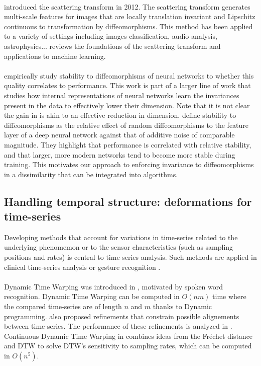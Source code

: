 \paragraph{}
\citet{mallat-scattering} introduced the scattering transform in 2012. The scattering transform generates multi-scale features for images that are locally translation invariant and Lipschitz continuous to transformation by diffeomorphisms. This method has been applied to a variety of settings including images classification, audio analysis, astrophysics... \citet{bruna-book} reviews the foundations of the scattering transform and applications to machine learning.

\paragraph{}
\citet{wyartdiffeo} empirically study stability to diffeomorphisms of neural networks to whether this quality correlates to performance. This work is part of a larger line of work that studies how internal representations of neural networks learn the invariances present in the data to effectively lower their dimension. Note that it is not clear the gain in \citet{bietti} is akin to an effective reduction in dimension. \citet{wyartdiffeo} define stability to diffeomorphisms as the relative effect of random diffeomorphisms to the feature layer of a deep neural network against that of additive noise of comparable magnitude. They highlight that performance is correlated with relative stability, and that larger, more modern networks tend to become more stable during training. This motivates our approach to enforcing invariance to diffeomorphisms in a dissimilarity that can be integrated into algorithms.

\subsection{Handling temporal structure: deformations for time-series}
\label{background:diffytw}

Developing methods that account for variations in time-series related to the underlying phenomemon or to the sensor characteristics (such as sampling positions and rates) is central to time-series analysis. Such methods are applied in clinical time-series analysis \citep{oh-invariances-clinical,ortiz-ieee} or gesture recognition \citep{dtw-gesture}.

\paragraph{} Dynamic Time Warping was introduced in \cite{dtw}, motivated by spoken word recognition. Dynamic Time Warping can be computed in $O(nm)$ time where the compared time-series are of length $n$ and $m$ thanks to Dynamic programming. \citep{dtw} also proposed refinements that constrain possible alignements between time-series. The performance of these refinements is analyzed in \cite{dtw-baseline-1}. Continuous Dynamic Time Warping in \cite{cdtw} combines ideas from the Fréchet distance and DTW to solve DTW's sensitivity to sampling rates, which can be computed in $O(n^5)$.

